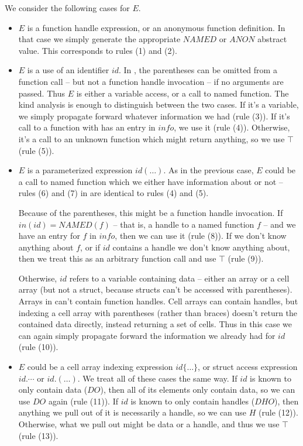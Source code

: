 We consider the following cases for $E$.

\begin{itemize}

  \item $E$ is a function handle expression, or an anonymous function
    definition. In that case we simply generate the appropriate $NAMED$ or
    $ANON$ abstract value. This corresponds to rules (1) and (2).

  \item $E$ is a use of an identifier $id$. In \matlab, the parentheses can be
    omitted from a function call -- but not a function handle invocation -- if
    no arguments are passed. Thus $E$ is either a variable access, or a call to
    named function. The kind analysis is enough to distinguish between the two
    cases. If it's a variable, we simply propagate forward whatever information
    we had (rule (3)). If it's call to a function with has an entry in $info$,
    we use it (rule (4)). Otherwise, it's a call to an unknown function which
    might return anything, so we use $\top$ (rule (5)).

  \item $E$ is a parameterized expression $id(\dots)$. As in the previous case,
    $E$ could be a call to named function which we either have information
    about or not -- rules (6) and (7) in  are
    identical to rules (4) and (5).

    Because of the parentheses, this might be a function handle invocation. If
    $in(id) = NAMED(f)$ -- that is, a handle to a named function $f$ -- and we
    have an entry for $f$ in $info$, then we can use it (rule (8)). If we don't
    know anything about $f$, or if $id$ contains a handle we don't know
    anything about, then we treat this as an arbitrary function call and use
    $\top$ (rule (9)).

    Otherwise, $id$ refers to a variable containing data -- either an array or
    a cell array (but not a struct, because structs can't be accessed with
    parentheses). Arrays in \matlab can't contain function handles. Cell arrays
    can contain handles, but indexing a cell array with parentheses (rather
    than braces) doesn't return the contained data directly, instead returning
    a set of cells. Thus in this case we can again simply propagate forward the
    information we already had for $id$ (rule (10)).

  \item $E$ could be a cell array indexing expression $id\lbrace\dots\rbrace$,
    or struct access expression $id.\cdots$ or $id.(\dots)$. We treat all of
    these cases the same way. If $id$ is known to only contain data ($DO$),
    then all of its elements only contain data, so we can use $DO$ again (rule
    (11)). If $id$ is known to only contain handles ($DHO$), then anything we
    pull out of it is necessarily a handle, so we can use $H$ (rule (12)).
    Otherwise, what we pull out might be data or a handle, and thus we use
    $\top$ (rule (13)).


\end{itemize}
